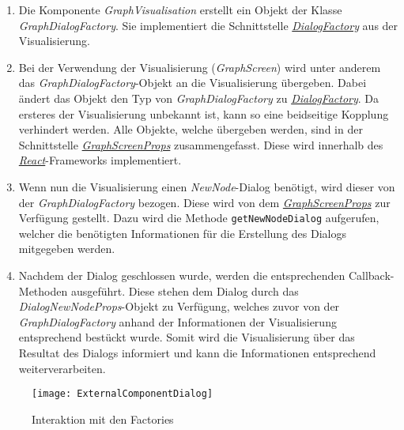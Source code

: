 \begin{enumerate}
    \item Die Komponente \textit{GraphVisualisation} erstellt ein Objekt der Klasse \textit{GraphDialogFactory}. Sie implementiert die Schnittstelle \hyperref[DialogFactory]{\textit{DialogFactory}} aus der Visualisierung.
    \item Bei der Verwendung der Visualisierung (\textit{GraphScreen}) wird unter anderem das \textit{GraphDialogFactory}-Objekt an die Visualisierung übergeben. Dabei ändert das Objekt den Typ von \textit{GraphDialogFactory} zu \hyperref[DialogFactory]{\textit{DialogFactory}}. Da ersteres der Visualisierung unbekannt ist, kann so eine beidseitige Kopplung verhindert werden. Alle Objekte, welche übergeben werden, sind in der Schnittstelle \hyperref[GraphScreenProps]{\textit{GraphScreenProps}} zusammengefasst. Diese wird innerhalb des \hyperref[react]{\textit{React}}-Frameworks implementiert.
    \item Wenn nun die Visualisierung einen \textit{NewNode}-Dialog benötigt, wird dieser von der \textit{GraphDialogFactory} bezogen. Diese wird von dem \hyperref[GraphScreenProps]{\textit{GraphScreenProps}} zur Verfügung gestellt. Dazu wird die Methode \texttt{getNewNodeDialog} aufgerufen, welcher die benötigten Informationen für die Erstellung des Dialogs mitgegeben werden.
    \item Nachdem der Dialog geschlossen wurde, werden die entsprechenden \gls{Callback}-Methoden ausgeführt. Diese stehen dem Dialog durch das \textit{DialogNewNodeProps}-Objekt zu Verfügung, welches zuvor von der \textit{GraphDialogFactory} anhand der Informationen der Visualisierung entsprechend bestückt wurde. Somit wird die Visualisierung über das Resultat des Dialogs informiert und kann die Informationen entsprechend weiterverarbeiten. 
\end{enumerate}

\begin{figure}[htbp]
\centerline{\texttt{[image: ExternalComponentDialog]}}
\caption{Interaktion mit den Factories}
\label{fig:interaction-dialog}
\end{figure}


